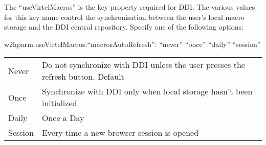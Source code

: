 \documentclass[letterpaper,10pt,english]{sphinxmanual}
\begin{document}
The “useVirtelMacros” is the key property required for DDI. The various values for this key name control the synchronisation between the user’s local macro storage and the DDI central repository. Specify one of the following options:

\begin{sphinxVerbatim}[commandchars=\\\{\}]
\PYGZdq{}w2hparm.useVirtelMacros\PYGZdq{}:\PYGZob{}“macrosAutoRefresh”: “never” \textbar{} “once” \textbar{} “daily” \textbar{} “session” \PYGZcb{}
\end{sphinxVerbatim}

\ignorespaces 
{}


\begin{savenotes}\sphinxattablestart
\centering
\begin{tabulary}{\linewidth}[t]{|T|T|}
\hline
\sphinxstyletheadfamily 
{}
&\sphinxstyletheadfamily 
{}
\\
\hline
Never
&
Do not synchronize with DDI unless the user presses the refresh button. Default
\\
\hline
Once
&
Synchronize with DDI only when local storage hasn’t been initialized
\\
\hline
Daily
&
Once a Day
\\
\hline
Session
&
Every time a new browser session is opened
\\
\hline
\end{tabulary}
\par
\sphinxattableend\end{savenotes}
\end{document}
